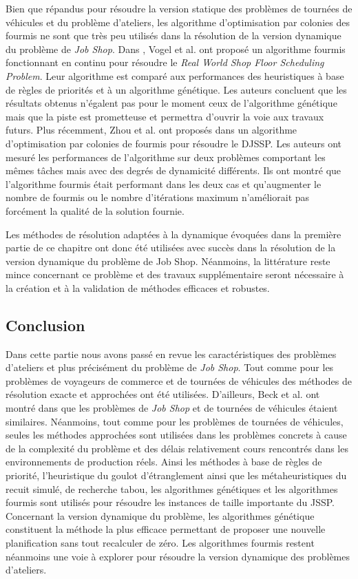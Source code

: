 Bien que répandus pour résoudre la version statique des problèmes de tournées de véhicules et du problème d'ateliers, les algorithme d'optimisation par colonies des fourmis ne sont que très peu utilisés dans la résolution de la version dynamique du problème de \textit{Job Shop}. Dans \cite{Vogel2002}, Vogel et al. ont proposé un algorithme fourmis fonctionnant en continu pour résoudre le \textit{Real World Shop Floor Scheduling Problem}. Leur algorithme est comparé aux performances des heuristiques à base de règles de priorités et à un algorithme génétique. Les auteurs concluent que les résultats obtenus n'égalent pas pour le moment ceux de l'algorithme génétique mais que la piste est prometteuse et permettra d'ouvrir la voie aux travaux futurs.
Plus récemment, Zhou et al. ont proposés dans \cite{Zhou2008} un algorithme d'optimisation par colonies de fourmis pour résoudre le DJSSP. Les auteurs ont mesuré les performances de l'algorithme sur deux problèmes comportant les mêmes tâches mais avec des degrés de dynamicité différents. Ils ont montré que l'algorithme fourmis était performant dans les deux cas et qu'augmenter le nombre de fourmis ou le nombre d'itérations maximum n'améliorait pas forcément la qualité de la solution fournie.

Les méthodes de résolution adaptées à la dynamique évoquées dans la première partie de ce chapitre ont donc été utilisées avec succès dans la résolution de la version dynamique du problème de Job Shop. Néanmoins, la littérature reste mince concernant ce problème et des travaux supplémentaire seront nécessaire à la création et à la validation de méthodes efficaces et robustes.

\subsection*{Conclusion}
Dans cette partie nous avons passé en revue les caractéristiques des problèmes d'ateliers et plus précisément du problème de \textit{Job Shop}. Tout comme pour les problèmes de voyageurs de commerce et de tournées de véhicules des méthodes de résolution exacte et approchées ont été utilisées. D'ailleurs, Beck et al. ont montré dans \cite{Beck2003} que les problèmes de \textit{Job Shop} et de tournées de véhicules étaient similaires. Néanmoins, tout comme pour les problèmes de tournées de véhicules, seules les méthodes approchées sont utilisées dans les problèmes concrets à cause de la complexité du problème et des délais relativement cours rencontrés dans les environnements de production réels.
Ainsi les méthodes à base de règles de priorité, l'heuristique du goulot d'étranglement ainsi que les métaheuristiques du recuit simulé, de recherche tabou, les algorithmes génétiques et les algorithmes fourmis sont utilisés pour résoudre les instances de taille importante du JSSP.
Concernant la version dynamique du problème, les algorithmes génétique constituent la méthode la plus efficace permettant de proposer une nouvelle planification sans tout recalculer de zéro. Les algorithmes fourmis restent néanmoins une voie à explorer pour résoudre la version dynamique des problèmes d'ateliers.